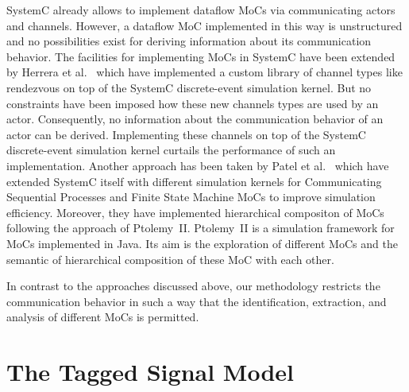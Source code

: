 SystemC \cite{glms:2002} already allows to implement
dataflow MoCs via communicating actors and  channels.
However, a dataflow MoC implemented in this way is unstructured
and no possibilities exist for deriving information about its
communication behavior. The facilities for implementing MoCs in
SystemC have been extended by Herrera et al.~\cite{herrerasystemc:2004}
which have implemented a custom library of channel types like rendezvous
on top of the SystemC discrete-event simulation kernel. But no
constraints have been imposed how these new channels types are used by
an actor. Consequently, no information about the communication behavior
of an actor can be derived.
Implementing these channels on top of the SystemC discrete-event
simulation kernel curtails the performance of such an implementation.
Another approach has been taken by Patel et al.~\cite{fermatmoc:2004}
which have extended SystemC itself with different simulation kernels
for Communicating Sequential Processes and Finite State Machine MoCs
to improve simulation efficiency. Moreover,
they have implemented hierarchical compositon of MoCs following
the approach of \hbox{Ptolemy II}. \hbox{Ptolemy II} \cite{ptolemyII} is a simulation
framework for MoCs implemented in Java. Its aim is the exploration of
different MoCs and the semantic of hierarchical composition of these MoC
with each other.

In contrast to the approaches discussed above, our methodology restricts
the communication behavior in such a way that the identification,
extraction, and analysis of different MoCs is permitted.

\section{The Tagged Signal Model}\label{lee-tsm}

